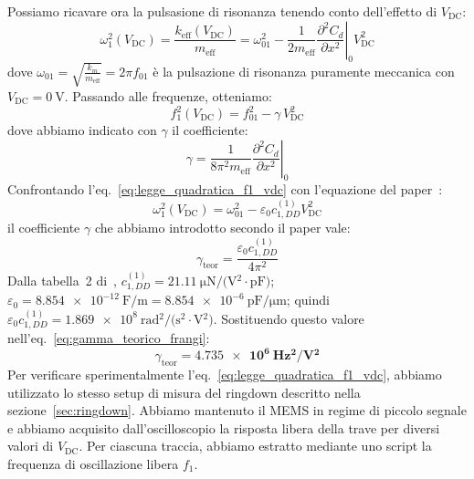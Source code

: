 \documentclass[11pt,a4paper]{article}
\begin{document}
\vspace{0.3cm}
\noindent 
Possiamo ricavare ora la pulsasione di risonanza tenendo conto dell'effetto di $V_{\text{DC}}$:
\begin{equation}
    \omega_1^2(V_{\text{DC}}) = \frac{k_{\text{eff}}(V_{\text{DC}})}{m_{\text{eff}}} = \omega_{01}^2 - \frac{1}{2 m_{\text{eff}}} \left. \frac{\partial^2 C_d}{\partial x^2} \right|_0 V_{\text{DC}}^2
\end{equation}
dove $\omega_{01} = \sqrt{\frac{k_m}{m_{\text{eff}}}} = 2\pi f_{01}$ è la pulsazione di risonanza puramente meccanica con $V_{\text{DC}} = \SI{0}{\volt}$. Passando alle frequenze, otteniamo:
\begin{equation}
    \label{eq:legge_quadratica_f1_vdc}
    f_1^2(V_{\text{DC}}) = f_{01}^2 - \gamma \, V_{\text{DC}}^2
\end{equation}
dove abbiamo indicato con $\gamma$ il coefficiente:
\begin{equation}
    \gamma = \frac{1}{8\pi^2 m_{\text{eff}}} \left. \frac{\partial^2 C_d}{\partial x^2} \right|_0
\end{equation}
Confrontando l'eq.~\eqref{eq:legge_quadratica_f1_vdc} con l'equazione del paper~\cite{frangi2023}:
\begin{equation}
    \omega_1^2(V_{\text{DC}}) = \omega_{01}^2 - \varepsilon_0 c_{1,DD}^{(1)} V_{\text{DC}}^2
\end{equation}
il coefficiente $\gamma$ che abbiamo introdotto secondo il paper vale:
\begin{equation}
    \label{eq:gamma_teorico_frangi}
    \gamma_{\text{teor}} = \frac{\varepsilon_0 c_{1,DD}^{(1)}}{4\pi^2}
\end{equation}
Dalla tabella~2 di~\cite{frangi2023}, $c_{1,DD}^{(1)} = \SI{21.11}{\micro\newton/(\volt^2 \cdot \pico\farad)}$; $\varepsilon_0 = \SI{8.854e-12}{\farad/\meter} = \SI{8.854e-6}{\pico\farad/\micro\meter}$; quindi $\varepsilon_0 c_{1,DD}^{(1)} = \SI{1.869e8}{\radian^2/(\second^2 \cdot \volt^2)}$. Sostituendo questo valore nell'eq.~\eqref{eq:gamma_teorico_frangi}:
\begin{equation}
    \gamma_{\text{teor}} = \mathbf{\SI{4.735e6}{\hertz^2/\volt^2}}
\end{equation}
Per verificare sperimentalmente l'eq.~\eqref{eq:legge_quadratica_f1_vdc}, abbiamo utilizzato lo stesso setup di misura del ringdown descritto nella sezione~\ref{sec:ringdown}. Abbiamo mantenuto il MEMS in regime di piccolo segnale e abbiamo acquisito dall'oscilloscopio la risposta libera della trave per diversi valori di $V_{\text{DC}}$. Per ciascuna traccia, abbiamo estratto mediante uno script la frequenza di oscillazione libera $f_1$.\\
\end{document}
